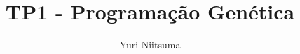 \documentclass[journal]{IEEEtran}
\begin{document}
  \title{TP1 - Programação Genética}
  \author{Yuri Niitsuma}

\maketitle

% 




\end{document}
